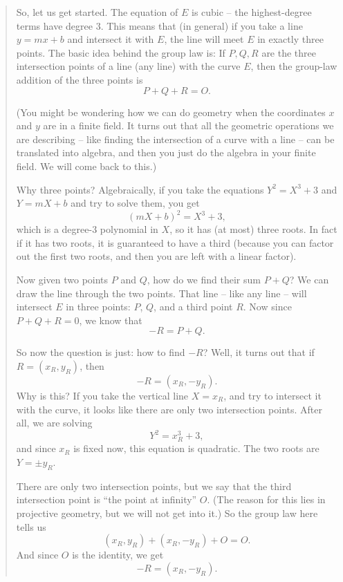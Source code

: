 \begin{quote}

So, let us get started. The equation of \(E\) is cubic -- the
highest-degree terms have degree \(3\). This means that (in general) if
you take a line \(y = mx + b\) and intersect it with \(E\), the line
will meet \(E\) in exactly three points. The basic idea behind the group
law is: If \(P,Q,R\) are the three intersection points of a line (any
line) with the curve \(E\), then the group-law addition of the three
points is \[P + Q + R = O.\]

(You might be wondering how we can do geometry when the coordinates
\(x\) and \(y\) are in a finite field. It turns out that all the
geometric operations we are describing -- like finding the intersection
of a curve with a line -- can be translated into algebra, and then you
just do the algebra in your finite field. We will come back to this.)

Why three points? Algebraically, if you take the equations
\(Y^{2} = X^{3} + 3\) and \(Y = mX + b\) and try to solve them, you get
\[(mX + b)^{2} = X^{3} + 3,\] which is a degree-3 polynomial in \(X\),
so it has (at most) three roots. In fact if it has two roots, it is
guaranteed to have a third (because you can factor out the first two
roots, and then you are left with a linear factor).

Now given two points \(P\) and \(Q\), how do we find their sum
\(P + Q\)? We can draw the line through the two points. That line --
like any line -- will intersect \(E\) in three points: \(P\), \(Q\), and
a third point \(R\). Now since \(P + Q + R = 0\), we know that
\[- R = P + Q.\]

So now the question is just: how to find \(- R\)? Well, it turns out
that if \(R = ( x_{R},y_{R} )\), then
\[- R = ( x_{R}, - y_{R} ).\] Why is this? If you take the
vertical line \(X = x_{R}\), and try to intersect it with the curve, it
looks like there are only two intersection points. After all, we are
solving \[Y^{2} = x_{R}^{3} + 3,\] and since \(x_{R}\) is fixed now,
this equation is quadratic. The two roots are \(Y = \pm y_{R}\).

There are only two intersection points, but we say that the third
intersection point is ``the point at infinity'' \(O\). (The reason for
this lies in projective geometry, but we will not get into it.) So the
group law here tells us
\[( x_{R},y_{R} ) + ( x_{R}, - y_{R} ) + O = O.\]
And since \(O\) is the identity, we get
\[- R = ( x_{R}, - y_{R} ).\]


\end{quote}
